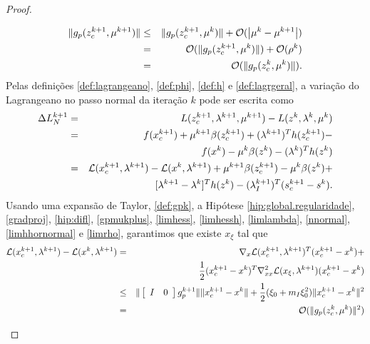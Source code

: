 \begin{proof}
\begin{description}
\begin{eqnarray}
    \norma{g_p(\zc{k+1},\mu^{k+1})} & \leq & \norma{g_p(\zc{k+1},\mu^k)} +
      \bigo(\modulo{\mu^k - \mu^{k+1}}) \nonumber \\ 
    & = & \bigo(\norma{g_p(\zc{k+1},\mu^k)}) + \bigo(\rho^k) \nonumber \\ 
    & = & \bigo(\norma{g_p(\zc{k},\mu^k)}). \visiblelbl{gpmukplus}
\end{eqnarray} 
Pelas definições \eqref{def:lagrangeano}, \eqref{def:phi}, \eqref{def:h} e
\eqref{def:lagrgeral}, a variação do Lagrangeano no passo normal da iteração $k$
pode ser escrita como
\begin{eqnarray}
  \DLV{k+1} 
    & = & L(\zc{k+1},\lk{k+1},\mu^{k+1}) - L(z^{k}, \lk{k}, \mu^k) \nonumber \\
    & = & f(\xc{k+1}) + \mu^{k+1}\beta(\zc{k+1}) + (\lk{k+1})^Th(\zc{k+1}) -
      \nonumber \\
    & & f(x^k) - \mu^k\beta(z^k) - (\lk{k})^T h(z^k) \nonumber \\
    & = & \mathcal{L}(\xc{k+1}, \lk{k+1}) - \mathcal{L}(x^k,\lk{k+1}) +
      \mu^{k+1}\beta(\zc{k+1}) - \mu^k\beta(z^k) + \nonumber \\
    & & [\lambda^{k+1} - \lambda^k]^Th(z^k) - (\lk{k+1}_I)^T(s_c^{k+1} - s^k).
      \visiblelbl{dlvaux4}
\end{eqnarray}
Usando uma expansão de Taylor, 
\eqref{def:gpk}, a Hipótese \ref{hip:global.regularidade},
\eqref{gradproj}, \eqref{hip:difl}, \eqref{gpmukplus}, 
\eqref{limhess}, \eqref{limhessh}, \eqref{limlambda},
\eqref{nnormal}, \eqref{limhhornormal} e \eqref{limrho},
garantimos que existe $x_\xi$ tal que
\begin{eqnarray}
  \mathcal{L}(\xc{k+1},\lk{k+1}) - \mathcal{L}(x^k,\lk{k+1})
  & = &\nabla_x \mathcal{L}(\xc{k+1},\lk{k+1})^T(\xc{k+1} - x^k) + \nonumber \\ 
  & & \meio (\xc{k+1}-x^k)^T\nabla_{xx}^2\mathcal{L} (x_{\xi},\lk{k+1})
    (\xc{k+1} - x^k) \nonumber \\
  & \leq & \norma{\vetord{I}{0}g_p^{k+1}}\norma{\xc{k+1}-x^k} +
    \meio(\xi_0+m_I\xi_0^2)\norma{\xc{k+1}-x^k}^2 \nonumber \\
    & = & \bigo(\norma{g_p(\zc{k},\mu^k)}^2) \visiblelbl{termo1.dlvaux4}
\end{eqnarray}


\end{description}
\end{proof}
